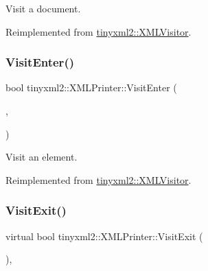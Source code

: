 Visit a document. 



Reimplemented from \mbox{\hyperlink{classtinyxml2_1_1_x_m_l_visitor_acb3c22fc5f60eb9db98f533f2761f67d}{tinyxml2\+::\+X\+M\+L\+Visitor}}.

\mbox{\label{classtinyxml2_1_1_x_m_l_printer_a169b2509d8eabb70811b2bb8cfd1f5d1}} 
\subsubsection{\texorpdfstring{Visit\+Enter()}{VisitEnter()}\hspace{0.1cm}{\footnotesize\ttfamily [2/2]}}
{\footnotesize\ttfamily bool tinyxml2\+::\+X\+M\+L\+Printer\+::\+Visit\+Enter (\begin{DoxyParamCaption}\item[{const \mbox{\hyperlink{classtinyxml2_1_1_x_m_l_element}{X\+M\+L\+Element}} \&}]{,  }\item[{const \mbox{\hyperlink{classtinyxml2_1_1_x_m_l_attribute}{X\+M\+L\+Attribute}} $\ast$}]{ }\end{DoxyParamCaption})\hspace{0.3cm}{\ttfamily [virtual]}}



Visit an element. 



Reimplemented from \mbox{\hyperlink{classtinyxml2_1_1_x_m_l_visitor_af97980a17dd4e37448b181f5ddfa92b5}{tinyxml2\+::\+X\+M\+L\+Visitor}}.

\mbox{\label{classtinyxml2_1_1_x_m_l_printer_a15fc1f2b922f540917dcf52808737b29}} 
\subsubsection{\texorpdfstring{Visit\+Exit()}{VisitExit()}\hspace{0.1cm}{\footnotesize\ttfamily [1/2]}}
{\footnotesize\ttfamily virtual bool tinyxml2\+::\+X\+M\+L\+Printer\+::\+Visit\+Exit (\begin{DoxyParamCaption}\item[{const \mbox{\hyperlink{classtinyxml2_1_1_x_m_l_document}{X\+M\+L\+Document}} \&}]{ }\end{DoxyParamCaption})\hspace{0.3cm}{\ttfamily [inline]}, {\ttfamily [virtual]}}



